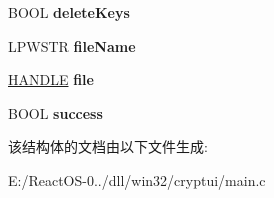 \begin{DoxyCompactItemize}
\item 
\mbox{\label{struct_export_wiz_data_a2b933a321aa6d1715a5b1fa35ed59fef}} 
B\+O\+OL {\bfseries delete\+Keys}
\item 
\mbox{\label{struct_export_wiz_data_a2762eda6db3416e8712b78e42ad102d1}} 
L\+P\+W\+S\+TR {\bfseries file\+Name}
\item 
\mbox{\label{struct_export_wiz_data_a3e9ecb15480a0cde2a4ee583ce30964b}} 
\hyperlink{interfacevoid}{H\+A\+N\+D\+LE} {\bfseries file}
\item 
\mbox{\label{struct_export_wiz_data_ab5bf4b24ce5d7cd45030cda4965a9767}} 
B\+O\+OL {\bfseries success}
\end{DoxyCompactItemize}


该结构体的文档由以下文件生成\+:\begin{DoxyCompactItemize}
\item 
E\+:/\+React\+O\+S-\/0../dll/win32/cryptui/main.\+c\end{DoxyCompactItemize}
